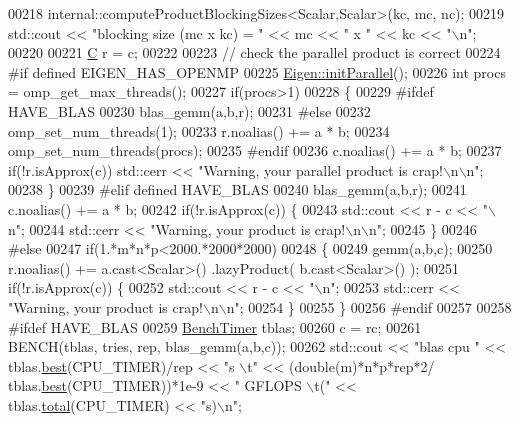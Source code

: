 \begin{DoxyCode}
00218   internal::computeProductBlockingSizes<Scalar,Scalar>(kc, mc, nc);
00219   std::cout << \textcolor{stringliteral}{"blocking size (mc x kc) = "} << mc << \textcolor{stringliteral}{" x "} << kc << \textcolor{stringliteral}{"\(\backslash\)n"};
00220 
00221   \hyperlink{group___core___module_class_eigen_1_1_matrix}{C} r = c;
00222 
00223   \textcolor{comment}{// check the parallel product is correct}
00224 \textcolor{preprocessor}{  #if defined EIGEN\_HAS\_OPENMP}
00225   \hyperlink{namespace_eigen_a820c0e0460934cc17eb6dacbad54a9f5}{Eigen::initParallel}();
00226   \textcolor{keywordtype}{int} procs = omp\_get\_max\_threads();
00227   \textcolor{keywordflow}{if}(procs>1)
00228   \{
00229 \textcolor{preprocessor}{    #ifdef HAVE\_BLAS}
00230     blas\_gemm(a,b,r);
00231 \textcolor{preprocessor}{    #else}
00232     omp\_set\_num\_threads(1);
00233     r.noalias() += a * b;
00234     omp\_set\_num\_threads(procs);
00235 \textcolor{preprocessor}{    #endif}
00236     c.noalias() += a * b;
00237     \textcolor{keywordflow}{if}(!r.isApprox(c)) std::cerr << \textcolor{stringliteral}{"Warning, your parallel product is crap!\(\backslash\)n\(\backslash\)n"};
00238   \}
00239 \textcolor{preprocessor}{  #elif defined HAVE\_BLAS}
00240     blas\_gemm(a,b,r);
00241     c.noalias() += a * b;
00242     \textcolor{keywordflow}{if}(!r.isApprox(c)) \{
00243       std::cout << r  - c << \textcolor{stringliteral}{"\(\backslash\)n"};
00244       std::cerr << \textcolor{stringliteral}{"Warning, your product is crap!\(\backslash\)n\(\backslash\)n"};
00245     \}
00246 \textcolor{preprocessor}{  #else}
00247     \textcolor{keywordflow}{if}(1.*m*n*p<2000.*2000*2000)
00248     \{
00249       gemm(a,b,c);
00250       r.noalias() += a.cast<Scalar>() .lazyProduct( b.cast<Scalar>() );
00251       \textcolor{keywordflow}{if}(!r.isApprox(c)) \{
00252         std::cout << r - c << \textcolor{stringliteral}{"\(\backslash\)n"};
00253         std::cerr << \textcolor{stringliteral}{"Warning, your product is crap!\(\backslash\)n\(\backslash\)n"};
00254       \}
00255     \}
00256 \textcolor{preprocessor}{  #endif}
00257 
00258 \textcolor{preprocessor}{  #ifdef HAVE\_BLAS}
00259   \hyperlink{class_eigen_1_1_bench_timer}{BenchTimer} tblas;
00260   c = rc;
00261   BENCH(tblas, tries, rep, blas\_gemm(a,b,c));
00262   std::cout << \textcolor{stringliteral}{"blas  cpu         "} << tblas.\hyperlink{class_eigen_1_1_bench_timer_ae8b673b0fa356d3432c7a65c79e8af0e}{best}(CPU\_TIMER)/rep  << \textcolor{stringliteral}{"s  \(\backslash\)t"} << (double(m)*n*p*rep*2/
      tblas.\hyperlink{class_eigen_1_1_bench_timer_ae8b673b0fa356d3432c7a65c79e8af0e}{best}(CPU\_TIMER))*1e-9  <<  \textcolor{stringliteral}{" GFLOPS \(\backslash\)t("} << tblas.\hyperlink{class_eigen_1_1_bench_timer_af341aa613dba2d4a3d167093197e4e7a}{total}(CPU\_TIMER)  << \textcolor{stringliteral}{"s)\(\backslash\)n"};

\end{DoxyCode}
